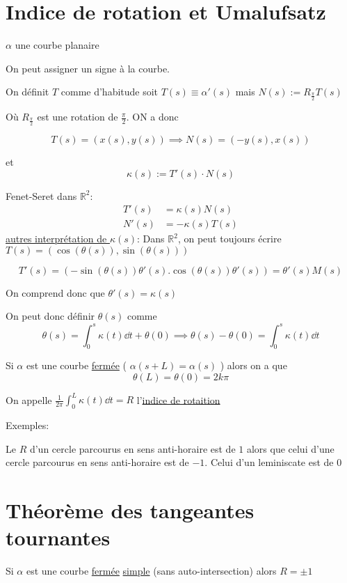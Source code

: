 


\section*{Indice de rotation et Umalufsatz}

$\alpha$ une courbe planaire

On peut assigner un signe à la courbe.

On définit $T$ comme d'habitude soit $T(s) \equiv \alpha'(s)$ mais $N(s):=R_{\frac{\pi}{2} }T(s)$ 

Où $R_{\frac{\pi}{2} }$ est une rotation de $\frac{\pi}{2}$. ON a donc

$$ T(s) = (x(s), y(s)) \implies N(s) = (-y(s), x(s))$$ 

et 
$$\kappa(s) := T'(s)\cdot N(s)$$ 

Fenet-Seret dans $\mathbb{R}^2$: $$\begin{aligned} T'(s) &= \kappa(s)N(s)\\ N'(s) &=-\kappa(s)T(s)\end{aligned}$$  
\underline{autres interprétation de $\kappa(s)$}: Dans $\mathbb{R}^2$, on peut toujours écrire $T(s) = (\cos(\theta(s)), \sin(\theta(s)))$  

$$T'(s) = (-\sin(\theta(s))\theta'(s). \cos(\theta(s))\theta'(s)) = \theta'(s)M(s)$$ 

On comprend donc que $\theta'(s) = \kappa(s)$ 

On peut donc définir $\theta(s)$ comme $$\theta(s) = \int_0^s\kappa(t) \dd t + \theta(0) \implies \theta(s)-\theta(0) = \int_0^s \kappa(t)\dd t$$  

Si $\alpha$ est une courbe \underline{fermée} ( $\alpha(s+L) = \alpha(s)$ ) alors on a que $$\theta(L) =\theta(0) = 2k\pi$$ 

On appelle $\frac{1}{2\pi} \int_0^L \kappa(t) \dd t = R$ l'\underline{indice de rotaition}

Exemples: 

Le $R$ d'un cercle parcourus en sens anti-horaire est de $1$ alors que celui d'une cercle parcourus en sens anti-horaire est de $-1$. Celui d'un leminiscate est de $0$

\section*{Théorème des tangeantes tournantes}

Si $\alpha$ est une courbe \underline{fermée} \underline{simple} (sans auto-intersection) alors $R=\pm1$  



